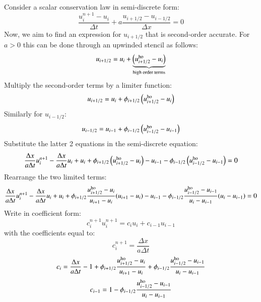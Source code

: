 \documentclass{warpdoc}
\begin{document}
Consider a scalar conservation law in semi-discrete form:
%
\begin{equation}
\frac{u^{n+1}_i - u_i }{\Delta t} + a \frac{u_{i+1/2}-u_{i-1/2}}{\Delta x} =0
\end{equation}
%
Now, we aim to find an expression for $u_{i+1/2}$ that is second-order accurate. For $a>0$ this can be done through an upwinded stencil as follows:
%
\begin{equation}
u_{i+1/2} = u_i + \underbrace{\left( u_{i+1/2}^{\rm ho} - u_i \right)}_{\textrm{high order terms}}
\end{equation}
% 
Multiply the second-order terms by a limiter function:
%
\begin{equation}
u_{i+1/2} = u_i +  \phi_{i+1/2} \left( u_{i+1/2}^{\rm ho} - u_i \right)
\end{equation}
% 
Similarly for $u_{i-1/2}$:
%
\begin{equation}
u_{i-1/2} = u_{i-1} + \phi_{i-1/2} \left( u_{i-1/2}^{\rm ho} - u_{i-1} \right)
\end{equation}
% 
Substitute the latter 2 equations in the semi-discrete equation:
%
\begin{equation}
\frac{\Delta x}{a\Delta t} u^{n+1}_i - \frac{\Delta x}{a\Delta t} u_i  
+ u_i + \phi_{i+1/2} \left( u_{i+1/2}^{\rm ho} - u_{i} \right)
- u_{i-1} - \phi_{i-1/2} \left( u_{i-1/2}^{\rm ho} - u_{i-1} \right) 
= 0
\end{equation}
%
Rearrange the two limited terms:
%
\begin{equation}
\frac{\Delta x}{a\Delta t} u^{n+1}_i - \frac{\Delta x}{a\Delta t} u_i  
+ u_i + \phi_{i+1/2} \frac{u_{i+1/2}^{\rm ho} - u_{i}}{u_{i+1}-u_i} (u_{i+1}-u_{i})
- u_{i-1} - \phi_{i-1/2} \frac{u_{i-1/2}^{\rm ho} - u_{i-1}}{u_{i} - u_{i-1}}(u_i-u_{i-1}) 
= 0
\end{equation}
%
Write in coefficient form:
%
\begin{equation}
c_i^{n+1} u^{n+1}_i = 
  c_i u_i  
+ c_{i-1} u_{i-1}
\end{equation}
%
with the coefficients equal to:
%
\begin{equation}
c_i^{n+1}=\frac{\Delta x}{a\Delta t}
\end{equation}
%
%
\begin{equation}
c_i=\frac{\Delta x}{a\Delta t} - 1 +  \phi_{i+1/2} \frac{u_{i+1/2}^{\rm ho} - u_{i}}{u_{i+1}-u_i}
 +  \phi_{i-1/2} \frac{u_{i-1/2}^{\rm ho} - u_{i-1}}{u_{i} - u_{i-1}}
\end{equation}
%
%
\begin{equation}
c_{i-1}=1 -\phi_{i-1/2} \frac{u_{i-1/2}^{\rm ho} - u_{i-1}}{u_{i} - u_{i-1}}
\end{equation}
\end{document}
